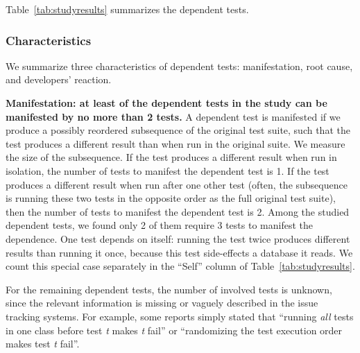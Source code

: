 

Table~\ref{tab:studyresults} summarizes the dependent tests.


\subsubsection{Characteristics}


We summarize three characteristics of dependent tests:
manifestation, root cause, and developers' reaction.

\vspace{1mm}
\noindent \textbf{{Manifestation: at least \pertange of the dependent
tests in the study can be manifested by no more than 2 tests.}}
A dependent test is manifested if we produce a possibly reordered
subsequence of the original test suite, such that the test
produces a different
result than when run in the original suite.
We measure the size of the subsequence.
If the test produces a different result when run
in isolation, the number of tests to manifest
the dependent test is 1.
If the test produces a different result
when run after one other test (often, the subsequence is
running these two tests in the opposite order as the full original test
suite), then the number of tests to manifest the dependent test is 2.
Among the \dtnum studied dependent tests, we found only 2 of them
require 3 tests to manifest the dependence.
One test depends on itself:
running the test twice produces different results than running it once,
because this test side-effects a database it reads.
We count this special case separately in the ``Self'' column
of Table~\ref{tab:studyresults}.

For the remaining \unum dependent tests, the number of involved tests
is unknown, since the relevant information is missing
or vaguely described in the issue tracking systems. For example,
some reports simply stated that ``running \textit{all} tests in one class before
test \emph{t} makes \emph{t} fail'' or ``randomizing the test execution order
makes test \emph{t} fail''.




